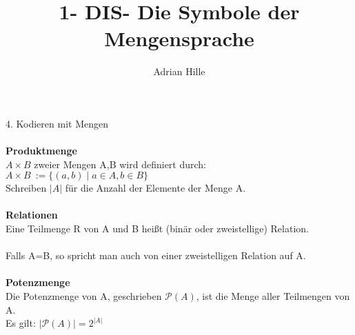 \documentclass{scrartcl}\usepackage[utf8]{inputenc}
\title{1- DIS- Die Symbole der Mengensprache}
\author{Adrian Hille}
\begin{document}
\Large 4. Kodieren mit Mengen\\
\\
\normalsize
\textbf{Produktmenge}\\
$A \times B$ zweier Mengen A,B wird definiert durch:\\
$A \times B\ := \{(a,b) \mid a \in A,b \in B\}$\\
Schreiben $\vert A\vert$ f\"ur die Anzahl der Elemente der Menge A. \\
\\
\textbf{Relationen}\\
Eine Teilmenge R von A und B hei\ss t (bin\"ar oder zweistellige) Relation.\\
\\
Falls A=B, so spricht man auch von einer zweistelligen Relation auf A.\\
\\
\textbf{Potenzmenge}\\
Die Potenzmenge von A, geschrieben $\mathcal{P}(A)$, ist die Menge aller Teilmengen von A.\\
Es gilt: $\vert \mathcal{P}(A) \vert = 2^{\vert A \vert}$\\
\end{document}
